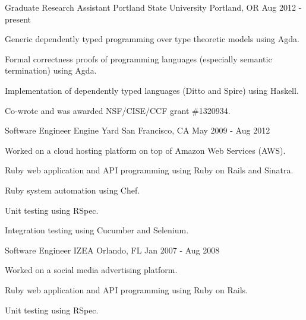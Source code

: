 

\begin{cventries}

  \cventry
    {Graduate Research Assistant} %
    {Portland State University} %
    {Portland, OR} %
    {Aug 2012 - present} %
    {
      \begin{cvitems} %
        \item {Generic dependently typed programming over type theoretic models using Agda.}
        \item {Formal correctness proofs of programming languages (especially semantic termination) using Agda.}
        \item {Implementation of dependently typed languages (Ditto and Spire) using Haskell.}
        \item {Co-wrote and was awarded NSF/CISE/CCF grant \#1320934.}
      \end{cvitems}
    }

  \cventry
    {Software Engineer} %
    {Engine Yard} %
    {San Francisco, CA} %
    {May 2009 - Aug 2012} %
    {
      \begin{cvitems} %
        \item {Worked on a cloud hosting platform on top of Amazon Web Services (AWS).}
        \item {Ruby web application and API programming using Ruby on Rails and Sinatra.}
        \item {Ruby system automation using Chef.}
        \item {Unit testing using RSpec.}
        \item {Integration testing using Cucumber and Selenium.}
      \end{cvitems}
    }

  \cventry
    {Software Engineer} %
    {IZEA} %
    {Orlando, FL} %
    {Jan 2007 - Aug 2008} %
    {
      \begin{cvitems} %
        \item {Worked on a social media advertising platform.}
        \item {Ruby web application and API programming using Ruby on Rails.}
        \item {Unit testing using RSpec.}
      \end{cvitems}
    }


\end{cventries}
